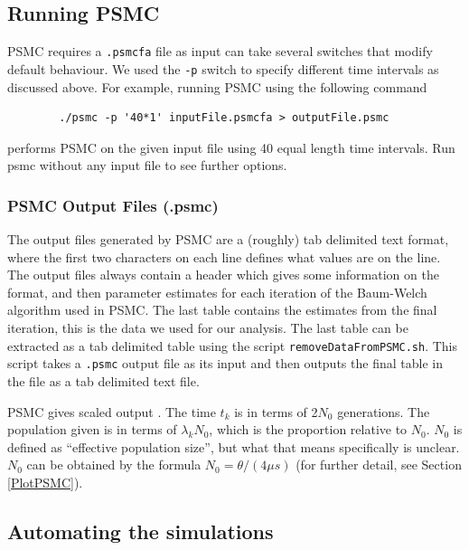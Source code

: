 \documentclass[11pt,a4paper]{article}
\begin{document}
\subsection{Running PSMC}
PSMC requires a \verb|.psmcfa| file as input can take several switches that modify default behaviour. We used the \verb|-p| switch to specify different time intervals as discussed above. For example, running PSMC using the following command
\begin{verbatim}
		./psmc -p '40*1' inputFile.psmcfa > outputFile.psmc
\end{verbatim}
performs PSMC on the given input file using 40 equal length time intervals. Run psmc without any input file to see further options.

\subsubsection{PSMC Output Files (.psmc)}
The output files generated by PSMC are a (roughly) tab delimited text format, where the first two characters on each line defines what values are on the line. The output files always contain a header which gives some information on the format, and then parameter estimates for each iteration of the Baum-Welch algorithm used in PSMC. The last table contains the estimates from the final iteration, this is the data we used for our analysis. The last table can be extracted as a tab delimited table using the script \verb|removeDataFromPSMC.sh|. This script takes a \verb|.psmc| output file as its input and then outputs the final table in the file as a tab delimited text file.

PSMC gives scaled output \cite{li2011inference}. The time $t_k$ is in terms of 2$N_0$ generations. The population given is in terms of $\lambda_kN_0$, which is the proportion relative to $N_0$. $N_0$ is defined as ``effective population size'', but what that means specifically is unclear. $N_0$ can be obtained by the formula $N_0=\theta/(4\mu s)$ (for further detail, see Section \ref{PlotPSMC}).

\subsection{Automating the simulations}
\end{document}
